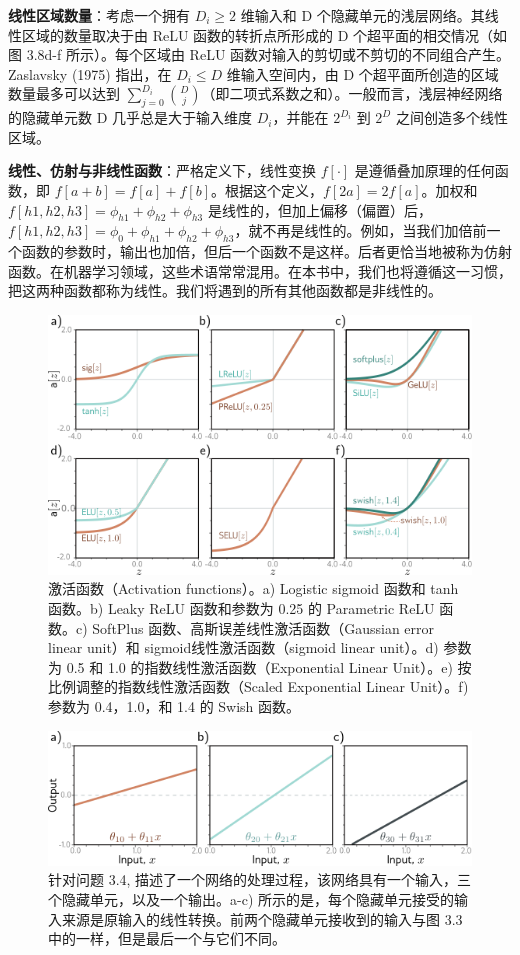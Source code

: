\textbf{线性区域数量}：考虑一个拥有 \(D_i \geq 2\) 维输入和 D 个隐藏单元的浅层网络。其线性区域的数量取决于由 ReLU 函数的转折点所形成的 D 个超平面的相交情况（如图 3.8d-f 所示）。每个区域由 ReLU 函数对输入的剪切或不剪切的不同组合产生。Zaslavsky (1975) 指出，在 \(D_i \leq D\) 维输入空间内，由 D 个超平面所创造的区域数量最多可以达到 \(\sum_{j=0}^{D_i} \binom{D}{j}\)（即二项式系数之和）。一般而言，浅层神经网络的隐藏单元数 D 几乎总是大于输入维度 \(D_i\)，并能在 \(2^{D_i}\) 到 \(2^D\) 之间创造多个线性区域。

\textbf{线性、仿射与非线性函数}：严格定义下，线性变换 \(f[\cdot]\) 是遵循叠加原理的任何函数，即  \(f[a + b] = f[a] + f[b]\)。根据这个定义，\(f[2a] = 2f[a]\)。加权和 \(f[h1, h2, h3] = \phi_{h1} + \phi_{h2} + \phi_{h3}\) 是线性的，但加上偏移（偏置）后，\(f[h1, h2, h3] = \phi_0 + \phi_{h1} + \phi_{h2} + \phi_{h3}\)，就不再是线性的。例如，当我们加倍前一个函数的参数时，输出也加倍，但后一个函数不是这样。后者更恰当地被称为仿射函数。在机器学习领域，这些术语常常混用。在本书中，我们也将遵循这一习惯，把这两种函数都称为线性。我们将遇到的所有其他函数都是非线性的。


\begin{figure}[ht!]
	\centering
	\includegraphics[width=0.7\linewidth]{png/chapter3/ShallowActivations.png}
\caption{激活函数（Activation functions）。a) Logistic sigmoid 函数和 tanh 函数。b) Leaky ReLU 函数和参数为 0.25 的 Parametric ReLU 函数。c) SoftPlus 函数、高斯误差线性激活函数（Gaussian error linear unit）和 sigmoid线性激活函数（sigmoid linear unit）。d) 参数为 0.5 和 1.0 的指数线性激活函数（Exponential Linear Unit）。e) 按比例调整的指数线性激活函数（Scaled Exponential Linear Unit）。f) 参数为 0.4，1.0，和 1.4 的 Swish 函数。}
\end{figure}

\begin{figure}[ht!]
	\centering
	\includegraphics[width=0.7\linewidth]{png/chapter3/ShallowChangeSlope.png}
\caption{针对问题 3.4, 描述了一个网络的处理过程，该网络具有一个输入，三个隐藏单元，以及一个输出。a-c) 所示的是，每个隐藏单元接受的输入来源是原输入的线性转换。前两个隐藏单元接收到的输入与图 3.3 中的一样，但是最后一个与它们不同。}
\end{figure}

